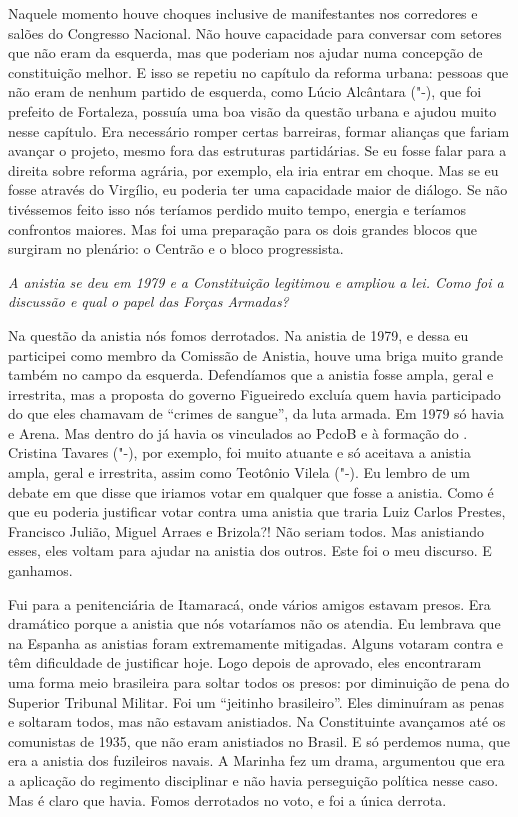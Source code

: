 Naquele momento houve choques inclusive de
manifestantes nos corredores e salões do Congresso Nacional. Não houve
capacidade para conversar com setores que não eram da esquerda, mas que
poderiam nos ajudar numa concepção de constituição melhor. E isso se
repetiu no capítulo da reforma urbana: pessoas que não eram de nenhum
partido de esquerda, como Lúcio Alcântara ("-), que foi prefeito de
Fortaleza, possuía uma boa visão da questão urbana e ajudou muito nesse
capítulo. Era necessário romper certas barreiras, formar alianças que
fariam avançar o projeto, mesmo fora das estruturas partidárias. Se eu
fosse falar para a direita sobre reforma agrária, por exemplo, ela iria
entrar em choque. Mas se eu fosse através do Virgílio, eu poderia ter
uma capacidade maior de diálogo. Se não tivéssemos feito isso nós
teríamos perdido muito tempo, energia e teríamos confrontos maiores. Mas
foi uma preparação para os dois grandes blocos que surgiram no plenário:
o Centrão e o bloco progressista.

\medskip

\noindent\emph{A anistia se deu em 1979 e a Constituição legitimou e ampliou a
lei. Como foi a discussão e qual o papel das Forças Armadas?}

Na questão da anistia nós fomos derrotados. Na anistia
de 1979, e dessa eu participei como membro da Comissão de Anistia, houve
uma briga muito grande também no campo da esquerda. Defendíamos que a
anistia fosse ampla, geral e irrestrita, mas a proposta do governo
Figueiredo excluía quem havia participado do que eles chamavam de
``crimes de sangue'', da luta armada. Em 1979 só havia  e Arena. Mas
dentro do  já havia os vinculados ao PcdoB e à formação do .
Cristina Tavares ("-), por exemplo, foi muito atuante e só aceitava
a anistia ampla, geral e irrestrita, assim como Teotônio Vilela
("-). Eu lembro de um debate em que disse que iriamos votar em
qualquer que fosse a anistia. Como é que eu poderia justificar votar
contra uma anistia que traria Luiz Carlos Prestes, Francisco Julião,
Miguel Arraes e Brizola?! Não seriam todos. Mas anistiando esses, eles
voltam para ajudar na anistia dos outros. Este foi o meu discurso. E
ganhamos.

Fui para a penitenciária de Itamaracá, onde vários amigos estavam
presos. Era dramático porque a anistia que nós votaríamos não os
atendia. Eu lembrava que na Espanha as anistias foram extremamente
mitigadas. Alguns votaram contra e têm dificuldade de justificar hoje.
Logo depois de aprovado, eles encontraram uma forma meio brasileira para
soltar todos os presos: por diminuição de pena do Superior Tribunal
Militar. Foi um ``jeitinho brasileiro''. Eles diminuíram as penas e
soltaram todos, mas não estavam anistiados. Na Constituinte avançamos
até os comunistas de 1935, que não eram anistiados no Brasil. E só
perdemos numa, que era a anistia dos fuzileiros navais. A Marinha fez um
drama, argumentou que era a aplicação do regimento disciplinar e não
havia perseguição política nesse caso. Mas é claro que havia. Fomos
derrotados no voto, e foi a única derrota.

